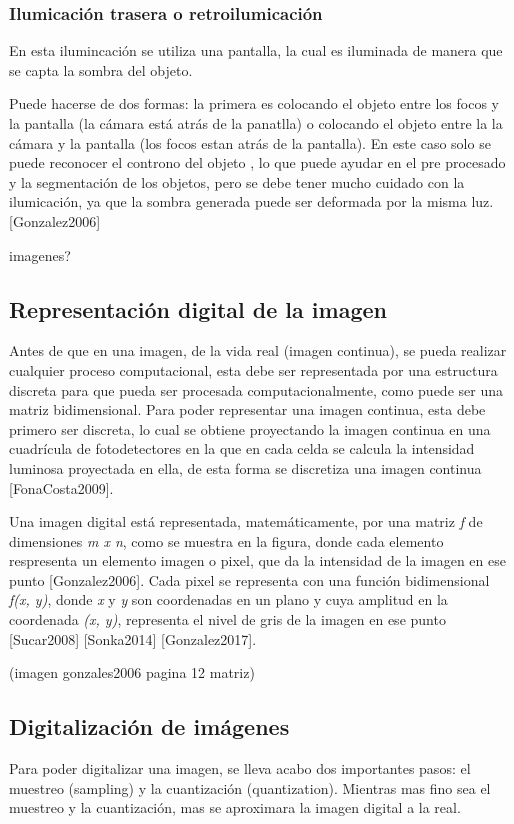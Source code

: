 \subsubsection{Ilumicación trasera o retroilumicación}
En esta ilumincación se utiliza una pantalla, la cual es iluminada de manera que se capta la sombra del objeto.

Puede hacerse de dos formas: la primera es colocando el objeto entre los focos y la pantalla (la cámara está atrás de la panatlla) o colocando el objeto entre la la cámara y la pantalla (los focos estan atrás de la pantalla). En este caso solo se puede reconocer el controno del objeto , lo que puede ayudar en el pre procesado y la segmentación de los objetos, pero se debe tener mucho cuidado con la ilumicación, ya que la sombra generada puede ser deformada por la misma luz. [Gonzalez2006]

imagenes?

\subsection{Representación digital de la imagen}
Antes de que en una imagen, de la vida real (imagen continua), se pueda realizar cualquier proceso computacional, esta debe ser representada por una estructura discreta para que pueda ser procesada computacionalmente, como puede ser una matriz bidimensional. Para poder representar una imagen continua, esta debe primero ser discreta, lo cual se obtiene proyectando la imagen continua en una cuadrícula de fotodetectores en la que en cada celda se calcula la intensidad luminosa proyectada en ella, de esta forma se discretiza una imagen continua [FonaCosta2009].

Una imagen digital está representada, matemáticamente, por una matriz \textit{f} de dimensiones \textit{m x n}, como se muestra en la figura, donde cada elemento respresenta un elemento imagen o pixel, que da la intensidad de la imagen en ese punto [Gonzalez2006]. Cada pixel se representa con una función bidimensional \textit{f(x, y)}, donde \textit{x} y \textit{y} son coordenadas en un plano y cuya amplitud en la coordenada \textit{(x, y)}, representa el nivel de gris de la imagen en ese punto [Sucar2008] [Sonka2014] [Gonzalez2017].

(imagen gonzales2006 pagina 12 matriz)

\subsection{Digitalización de imágenes}
Para poder digitalizar una imagen, se lleva acabo dos importantes pasos: el muestreo (sampling) y la cuantización  (quantization). Mientras mas fino sea el muestreo y la cuantización, mas se aproximara la imagen digital a la real.

